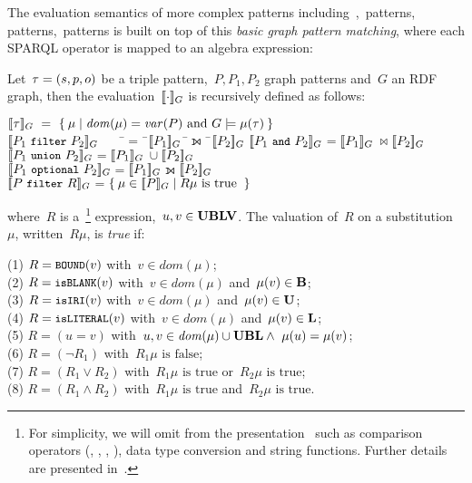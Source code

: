 




%
The evaluation semantics of more complex patterns including~,~\OPTIONAL patterns,~\AND
patterns,~\UNION patterns is built on top of this \emph{basic graph pattern matching}, where each SPARQL operator is
mapped to an algebra expression:
%
\begin{definition}
\label{def:semantics-sparql}
Let~$\tau = (s,p,o)$ be a triple pattern,~$P, P_1, P_2$ graph patterns and~$G$ an \ac{RDF} graph, then the
evaluation~$[\![ \cdot ]\!]_{G}$ is recursively defined as follows: {
%
\begin{tabbing}
  $[\![ \tau ]\!]_{G}\ =\ \left\{\: \mu \mid \mathit{dom}(\mu)=\mathit{var}(P)\textrm{ and }G \models \mu(\tau) \:\right\}$\\
  $\eval{P_1\ \FILTER\ P_2}_{G}\quad\quad$\=$=$\ \=$[\![ P_1 ]\!]_{G}$\ \=$\leftouterjoin$\ \=$[\![ P_2 ]\!]_{G}$\kill
  $\eval{P_1\ \AND\ P_2}_{G}$\>$=$\>$[\![ P_1 ]\!]_{G}$\>$\ \bowtie$\>$[\![ P_2 ]\!]_{G}$\\
  $\eval{P_1\ \UNION\ P_2}_{G}$\>$=$\>$[\![ P_1 ]\!]_{G}$\>$\ \cup$\>$[\![ P_2 ]\!]_{G}$\\
  $\eval{P_1\ \OPTIONAL\ P_2}_{G}$\>$=$\>$[\![ P_1 ]\!]_{G}$\>$\leftouterjoin$\>$[\![ P_2 ]\!]_{G}$\\
  $\eval{P\ \FILTER\ R}_{G}$\>$=$\>$\left\{\: \mu \in [\![ P ]\!]_{G} \mid R\mu \mbox{ is true } \:\right\}$
\end{tabbing}}
%
\nd where~$R$ is a~\FILTER\footnote{For simplicity, we will omit from the presentation~ such as
  comparison operators (\character{$<$}, \character{$>$}, \character{$\leq$}, \character{$\geq$}), data type conversion
  and string functions.  Further details are presented in~\citet[Section 11.3]{PrudhommeauxSeaborne:2008aa}.}
expression,~$u,v \in \mathbf{UBLV}$. The valuation of~$R$ on a substitution~$\mu$, written~$R\mu$, is \emph{true} if:
%
{
\begin{tabbing}
(1) $R = \texttt{{\small BOUND}}(v)$ with~$v \in \mathit{dom}(\mu)$;\\
(2) $R = \texttt{{\small isBLANK}}(v)$ with~$v \in \mathit{dom}(\mu)$ and~$\mu(v) \in \mathbf{B}$;\\
(3) $R = \texttt{{\small isIRI}}(v)$ with~$v \in \mathit{dom}(\mu)$ and~$\mu(v) \in \mathbf{U}$;\\
(4) $R = \texttt{{\small isLITERAL}}(v)$ with~$v \in \mathit{dom}(\mu)$ and~$\mu(v) \in \mathbf{L}$;\\
(5) $R = (u = v)$ with~$u,v \in \mathit{dom}(\mu)\cup \mathbf{UBL} \wedge\ \mu(u) = \mu(v)$;\\
(6) $R = (\neg R_1)$ with~$R_1\mu\mbox{ is false}$;\\
(7) $R = (R_1 \vee R_2 )$ with~$R_1\mu\mbox{ is true}$ or~$R_2\mu\mbox{ is true}$;\\
(8) $R = (R_1 \wedge R_2)$ with~$R_1\mu\mbox{ is true}$ and~$R_2\mu\mbox{ is true}$.
\end{tabbing}}


\end{definition}
